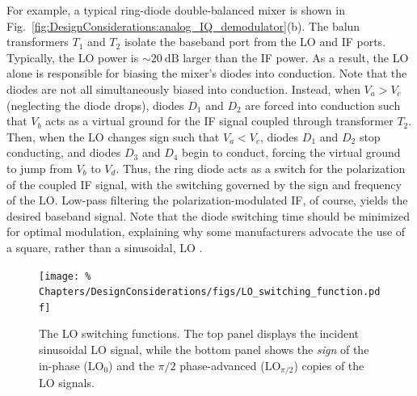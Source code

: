 For example, a typical ring-diode double-balanced mixer
is shown in Fig.~\ref{fig:DesignConsiderations:analog_IQ_demodulator}(b).
The balun transformers $T_1$ and $T_2$
isolate the baseband port from the LO and IF ports.
Typically, the LO power is $\sim \SI{20}{\deci\bel}$ larger than the IF power.
As a result, the LO alone is responsible
for biasing the mixer's diodes into conduction.
Note that the diodes are not all simultaneously biased into conduction.
Instead, when $V_a > V_c$ (neglecting the diode drops),
diodes $D_1$ and $D_2$ are forced into conduction such that
$V_b$ acts as a virtual ground for the IF signal
coupled through transformer $T_2$.
Then, when the LO changes sign such that $V_a < V_c$,
diodes $D_1$ and $D_2$ stop conducting, and
diodes $D_3$ and $D_4$ begin to conduct,
forcing the virtual ground to jump from $V_b$ to $V_d$.
Thus, the ring diode acts as a switch
for the polarization of the coupled IF signal,
with the switching governed by the sign and frequency of the LO.
Low-pass filtering the polarization-modulated IF, of course,
yields the desired baseband signal.
Note that the diode switching time should be minimized
for optimal modulation,
explaining why some manufacturers
advocate the use of a square, rather than a sinusoidal, LO
\cite{minicircuits_mixer_faqs}.

\begin{figure}
  \centering
  \texttt{[image: \%
    Chapters/DesignConsiderations/figs/LO\_switching\_function.pdf]}
  \caption[LO switching functions]{%
    The LO switching functions.
    The top panel displays the incident sinusoidal LO signal, while
    the bottom panel shows the \emph{sign} of
    the in-phase ($\text{LO}_0$) and
    the $\pi / 2$ phase-advanced ($\text{LO}_{\pi / 2}$)
    copies of the LO signals.}
  \label{fig:DesignConsiderations:LO_switching_function}
\end{figure}

